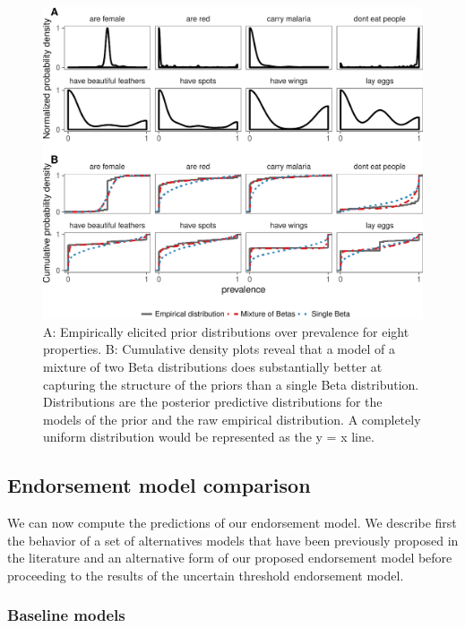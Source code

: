 \documentclass[english,,man,floatsintext]{apa6}
\theoremstyle{definition}
\theoremstyle{definition}
\theoremstyle{definition}
\theoremstyle{remark}
\begin{document}
\begin{figure}[!h]
\includegraphics[width=\textwidth]{figs/generic-endorsement-priors-figure-1} \caption{A: Empirically elicited prior distributions over prevalence for eight properties. B: Cumulative density plots reveal that a model of a mixture of two Beta distributions does substantially better at capturing the structure of the priors than a single Beta distribution. Distributions are the posterior predictive distributions for the models of the prior and the raw empirical distribution. A completely uniform distribution would be represented as the y = x line.}\label{fig:generic-endorsement-priors-figure}
\end{figure}

\hypertarget{endorsement-model-comparison}{%
\subsection{Endorsement model
comparison}\label{endorsement-model-comparison}}

We can now compute the predictions of our endorsement model. We describe
first the behavior of a set of alternatives models that have been
previously proposed in the literature and an alternative form of our
proposed endorsement model before proceeding to the results of the
uncertain threshold endorsement model.

\hypertarget{baseline-models}{%
\subsubsection{Baseline models}\label{baseline-models}}
\end{document}

